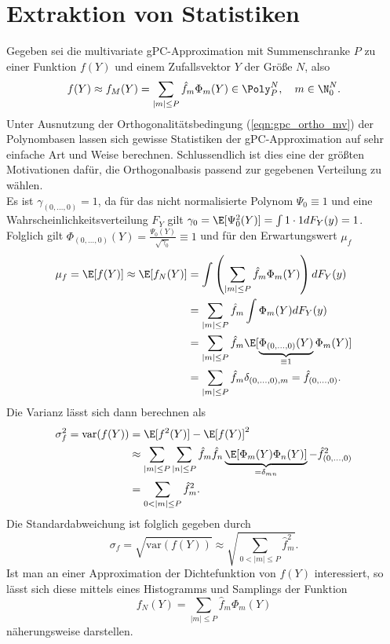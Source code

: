 \section{Extraktion von Statistiken}
Gegeben sei die multivariate gPC-Approximation mit Summenschranke $P$ zu einer Funktion $f(Y)$ und einem Zufallsvektor $Y$ der Größe $N$, also
\[f(Y)\approx f_M(Y)=\sum_{|m|\le P}\hat{f}_m\Phi_m(Y)\in\Poly_P^N,\quad m\in\N_0^N.\]
Unter Ausnutzung der Orthogonalitätsbedingung (\ref{eqn:gpc_ortho_mv}) der Polynombasen lassen sich gewisse Statistiken der gPC-Approximation auf sehr einfache Art und Weise berechnen. Schlussendlich ist dies eine der größten Motivationen dafür, die Orthogonalbasis passend zur gegebenen Verteilung zu wählen.\\
Es ist $\gamma_{(0,\dots,0)}=1$, da für das nicht normalisierte Polynom $\Psi_0\equiv 1$ und eine Wahrscheinlichkeitsverteilung $F_Y$ gilt $\gamma_0=\E[\Psi_0^2(Y)]=\int 1\cdot 1dF_Y(y)=1$. Folglich gilt $\Phi_{(0,\dots,0)}(Y)= \frac{\Psi_0(Y)}{\sqrt{\gamma_0}}\equiv 1$ und für den Erwartungswert $\mu_f$
\begin{equation}
\label{eqn:gpc_approx_exp}
\begin{split}
\mu_f=\E[f(Y)]\approx \E[f_N(Y)]&=\int\left(\sum_{|m|\le P}\hat{f}_m\Phi_m(Y)\right)dF_Y(y)\\
&=\sum_{|m|\le P}\hat{f}_m\int\Phi_m(Y)dF_Y(y)\\
&=\sum_{|m|\le P}\hat{f}_m\E[\underbrace{\Phi_{(0,\dots,0)}(Y)}_{\equiv 1} \Phi_m(Y)]\\
&=\sum_{|m|\le P}\hat{f}_m\delta_{(0,\dots,0),m}=\hat{f}_{(0,\dots,0)}.
\end{split}
\end{equation}
Die Varianz lässt sich dann berechnen als
\begin{align*}
\sigma^2_f=\text{var}(f(Y))&=\E[f^2(Y)]-\E[f(Y)]^2\\
&\approx \sum_{|m|\le P}\sum_{|n|\le P}\hat{f}_m\hat{f}_n\underbrace{\E[\Phi_m(Y)\Phi_n(Y)]}_{=\delta_{mn}}-\hat{f}_{(0,\dots,0)}^2\\
&=\sum_{0<|m|\le P}\hat{f}_m^2.
\end{align*}
Die Standardabweichung ist folglich gegeben durch
\[\sigma_f=\sqrt{\text{var}(f(Y))}\approx\sqrt{\sum_{0<|m|\le P}\hat{f}_m^2}.\]
Ist man an einer Approximation der Dichtefunktion von $f(Y)$ interessiert, so lässt sich diese mittels eines Histogramms und Samplings der Funktion 
\[f_N(Y)=\sum_{|m|\le P}\hat{f}_m\Phi_m(Y)\]
näherungsweise darstellen.\\[0.2cm]
